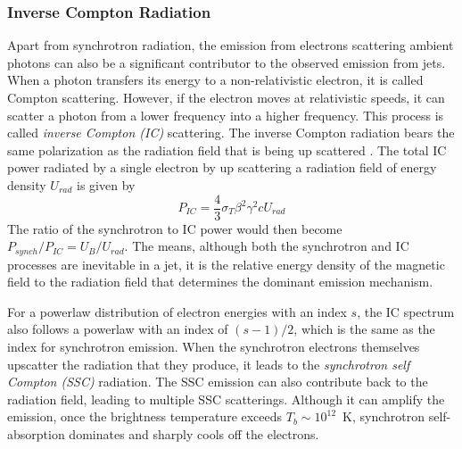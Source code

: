 \subsubsection{Inverse Compton Radiation\label{subsec:ic}}
Apart from synchrotron radiation, the emission from electrons scattering ambient photons can also be a significant contributor to the observed emission from jets.
When a photon transfers its energy to a non-relativistic electron, it is called Compton scattering. However, if the electron moves at relativistic speeds, it can scatter a photon from a lower frequency into a higher frequency. This process is called \textit{inverse Compton (IC)} scattering. The inverse Compton radiation bears the same polarization as the radiation field that is being up scattered \citep{uchiyama2007infrared}. The total IC power radiated by a single electron by up scattering a radiation field of energy density $U_{rad}$ is given by
\begin{equation}
    P_{IC} =\frac{4}{3}\sigma_T\beta^2\gamma^2cU_{rad}
\end{equation}
The ratio of the synchrotron to IC power would then become $P_{synch}/P_{IC}=U_B/U_{rad}$. The means, although both the synchrotron and IC processes are inevitable in a jet, it is the relative energy density of the magnetic field to the radiation field that determines the dominant emission mechanism. 

For a powerlaw distribution of electron energies with an index $s$, the IC spectrum also follows a powerlaw with an index of $(s-1)/2$, which is the same as the index for synchrotron emission. When the synchrotron electrons themselves upscatter the radiation that they produce, it leads to the \textit{synchrotron self Compton (SSC)} radiation. The SSC emission can also contribute back to the radiation field, leading to multiple SSC scatterings. Although it can amplify the emission, once the brightness temperature exceeds $T_b\sim10^{12}$~K, synchrotron self-absorption dominates and sharply cools off the electrons.


